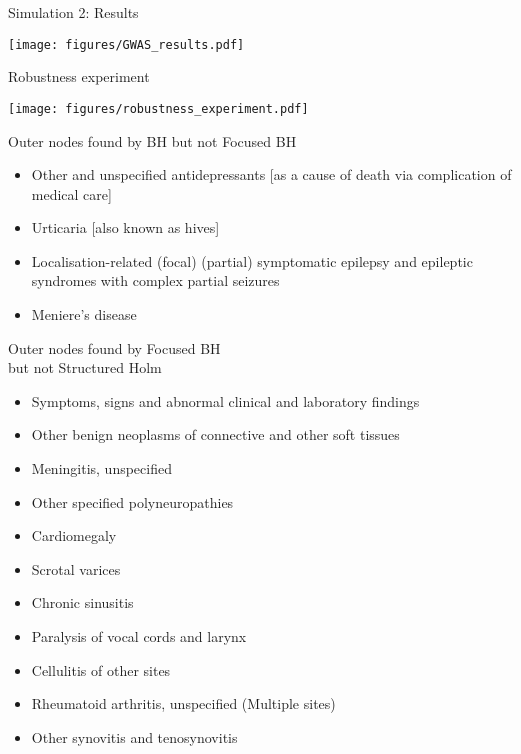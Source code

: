 \documentclass{beamer}
\begin{document}
\begin{frame}{Simulation 2: Results}
	\begin{center}
		\texttt{[image: figures/GWAS\_results.pdf]}
	\end{center}
\end{frame}


\begin{frame}{Robustness experiment}

\centering
\texttt{[image: figures/robustness\_experiment.pdf]}

\end{frame}

\begin{frame}{Outer nodes found by BH but not Focused BH}
	
	\begin{itemize}
		\item Other and unspecified antidepressants [as a cause of death via complication of medical care]
		\item Urticaria [also known as hives]
		\item Localisation-related (focal) (partial) symptomatic epilepsy and epileptic syndromes with complex partial seizures
		\item Meniere's disease
	\end{itemize}
	
\end{frame}

\begin{frame}{Outer nodes found by Focused BH \\ but not Structured Holm}
	
	\begin{itemize}
		\item Symptoms, signs and abnormal clinical and laboratory findings
		\item Other benign neoplasms of connective and other soft tissues
		\item Meningitis, unspecified    
		\item Other specified polyneuropathies 
		\item Cardiomegaly 
		\item Scrotal varices 
		\item Chronic sinusitis      
		\item Paralysis of vocal cords and larynx
		\item Cellulitis of other sites 
		\item Rheumatoid arthritis, unspecified (Multiple sites)
		\item Other synovitis and tenosynovitis 
	\end{itemize}
	
\end{frame}
\end{document}
